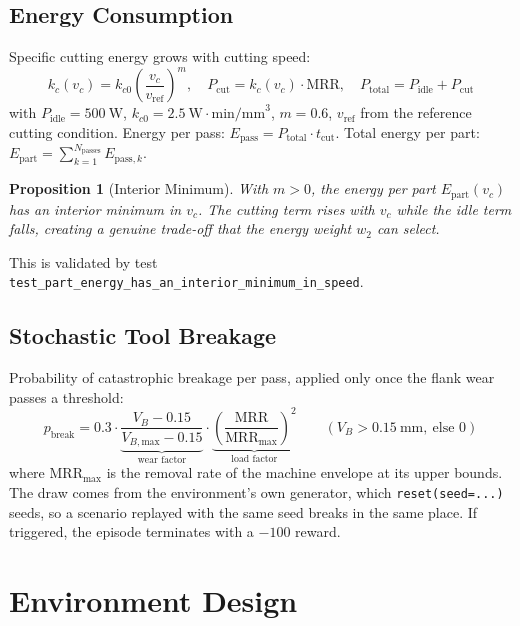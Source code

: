 \documentclass[11pt,a4paper]{article}
\newtheorem{proposition}{Proposition}
\newcommand{\MRR}{\mathrm{MRR}}
\newcommand{\VB}{V_B}
\newcommand{\VBMax}{V_{B,\text{max}}}
\begin{document}
\subsection{Energy Consumption}
\label{sec:energy}
Specific cutting energy grows with cutting speed:
\begin{equation}
    k_c(v_c) = k_{c0} \left( \frac{v_c}{v_\text{ref}} \right)^m,
    \quad P_\text{cut} = k_c(v_c) \cdot \MRR,
    \quad P_\text{total} = P_\text{idle} + P_\text{cut}
    \label{eq:energy}
\end{equation}
with $P_\text{idle}=500\ \text{W}$, $k_{c0}=2.5\ \text{W}\cdot\text{min/mm}^3$, $m=0.6$, $v_\text{ref}$ from the reference cutting condition.
Energy per pass: $E_\text{pass} = P_\text{total} \cdot t_\text{cut}$.
Total energy per part: $E_\text{part} = \sum_{k=1}^{N_\text{passes}} E_{\text{pass},k}$.

\begin{proposition}[Interior Minimum]
With $m>0$, the energy per part $E_\text{part}(v_c)$ has an interior minimum in $v_c$. The cutting term rises with $v_c$ while the idle term falls, creating a genuine trade-off that the energy weight $w_2$ can select.
\end{proposition}
This is validated by test \texttt{test\_part\_energy\_has\_an\_interior\_minimum\_in\_speed}.

\subsection{Stochastic Tool Breakage}
Probability of catastrophic breakage per pass, applied only once the flank wear passes a threshold:
\begin{equation}
    p_\text{break} = 0.3 \cdot \underbrace{\frac{\VB - 0.15}{\VBMax - 0.15}}_{\text{wear factor}} \cdot \underbrace{\left(\frac{\MRR}{\MRR_\text{max}}\right)^2}_{\text{load factor}}
    \qquad (\VB > 0.15\ \text{mm},\ \text{else } 0)
\end{equation}
where $\MRR_\text{max}$ is the removal rate of the machine envelope at its upper bounds. The draw comes from the environment's own generator, which \texttt{reset(seed=...)} seeds, so a scenario replayed with the same seed breaks in the same place. If triggered, the episode terminates with a $-100$ reward.

\section{Environment Design}
\end{document}
